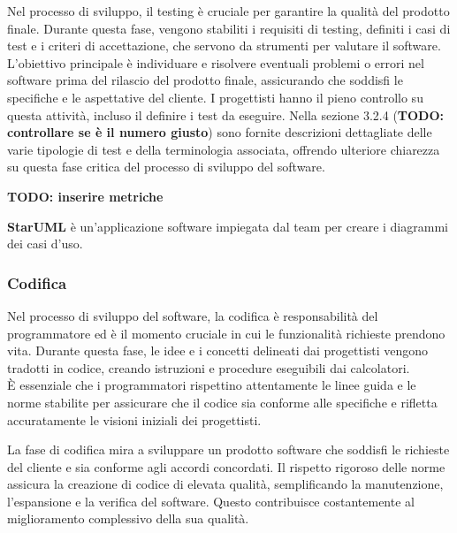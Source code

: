 Nel processo di sviluppo, il testing è cruciale per garantire la qualità del prodotto finale. Durante questa fase, vengono stabiliti i requisiti di testing, definiti i casi di test e i criteri di accettazione, che servono da strumenti per valutare il software.\\ L'obiettivo principale è individuare e risolvere eventuali problemi o errori nel software prima del rilascio del prodotto finale, assicurando che soddisfi le specifiche e le aspettative del cliente. I progettisti hanno il pieno controllo su questa attività, incluso il definire i test da eseguire. Nella sezione 3.2.4 (\textbf{TODO: controllare se è il numero giusto}) sono fornite descrizioni dettagliate delle varie tipologie di test e della terminologia associata, offrendo ulteriore chiarezza su questa fase critica del processo di sviluppo del software.

\textbf{TODO: inserire metriche}

\textbf{StarUML} è un'applicazione software impiegata dal team per creare i diagrammi dei casi d'uso.

\subsubsection{Codifica}
Nel processo di sviluppo del software, la codifica è responsabilità del programmatore ed è il momento cruciale in cui le funzionalità richieste prendono vita. Durante questa fase, le idee e i concetti delineati dai progettisti vengono tradotti in codice, creando istruzioni e procedure eseguibili dai calcolatori.\\ È essenziale che i programmatori rispettino attentamente le linee guida e le norme stabilite per assicurare che il codice sia conforme alle specifiche e rifletta accuratamente le visioni iniziali dei progettisti.

La fase di codifica mira a sviluppare un prodotto software che soddisfi le richieste del cliente e sia conforme agli accordi concordati. Il rispetto rigoroso delle norme assicura la creazione di codice di elevata qualità, semplificando la manutenzione, l'espansione e la verifica del software. Questo contribuisce costantemente al miglioramento complessivo della sua qualità.

